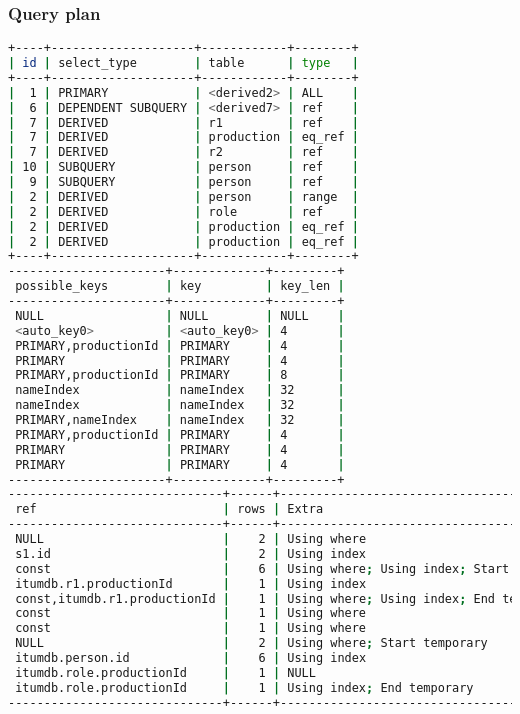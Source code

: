 \subsubsection{Query plan}
\begin{lstlisting}[language=bash]
+----+--------------------+------------+--------+
| id | select_type        | table      | type   |
+----+--------------------+------------+--------+
|  1 | PRIMARY            | <derived2> | ALL    |
|  6 | DEPENDENT SUBQUERY | <derived7> | ref    |
|  7 | DERIVED            | r1         | ref    |
|  7 | DERIVED            | production | eq_ref |
|  7 | DERIVED            | r2         | ref    |
| 10 | SUBQUERY           | person     | ref    |
|  9 | SUBQUERY           | person     | ref    |
|  2 | DERIVED            | person     | range  |
|  2 | DERIVED            | role       | ref    |
|  2 | DERIVED            | production | eq_ref |
|  2 | DERIVED            | production | eq_ref |
+----+--------------------+------------+--------+
----------------------+-------------+---------+
 possible_keys        | key         | key_len |
----------------------+-------------+---------+
 NULL                 | NULL        | NULL    |
 <auto_key0>          | <auto_key0> | 4       |
 PRIMARY,productionId | PRIMARY     | 4       |
 PRIMARY              | PRIMARY     | 4       |
 PRIMARY,productionId | PRIMARY     | 8       |
 nameIndex            | nameIndex   | 32      |
 nameIndex            | nameIndex   | 32      |
 PRIMARY,nameIndex    | nameIndex   | 32      |
 PRIMARY,productionId | PRIMARY     | 4       |
 PRIMARY              | PRIMARY     | 4       |
 PRIMARY              | PRIMARY     | 4       |
----------------------+-------------+---------+
------------------------------+------+-------------------------------------------+
 ref                          | rows | Extra                                     |
------------------------------+------+-------------------------------------------+
 NULL                         |    2 | Using where                               |
 s1.id                        |    2 | Using index                               |
 const                        |    6 | Using where; Using index; Start temporary |
 itumdb.r1.productionId       |    1 | Using index                               |
 const,itumdb.r1.productionId |    1 | Using where; Using index; End temporary   |
 const                        |    1 | Using where                               |
 const                        |    1 | Using where                               |
 NULL                         |    2 | Using where; Start temporary              |
 itumdb.person.id             |    6 | Using index                               |
 itumdb.role.productionId     |    1 | NULL                                      |
 itumdb.role.productionId     |    1 | Using index; End temporary                |
------------------------------+------+-------------------------------------------+

\end{lstlisting}

